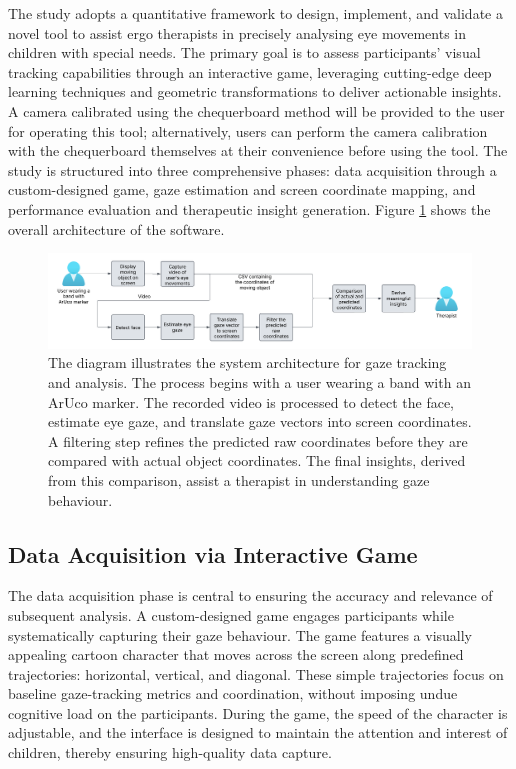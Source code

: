 \documentclass[10pt,a4paper,twoside]{article}
\begin{document}
The study adopts a quantitative framework to design, implement, and validate a novel tool to assist ergo therapists in precisely analysing eye movements in children with special needs. The primary goal is to assess participants' visual tracking capabilities through an interactive game, leveraging cutting-edge deep learning techniques and geometric transformations to deliver actionable insights. A camera calibrated using the chequerboard method will be provided to the user for operating this tool; alternatively, users can perform the camera calibration with the chequerboard themselves at their convenience before using the tool. The study is structured into three comprehensive phases: data acquisition through a custom-designed game, gaze estimation and screen coordinate mapping, and performance evaluation and therapeutic insight generation. Figure \ref{fig:flowchart} shows the overall architecture of the software.

\begin{figure}[htbp]
    \centering
    \includegraphics[width=\textwidth]{image/flowchart.png}
    \caption{The diagram illustrates the system architecture for gaze tracking and analysis. The process begins with a user wearing a band with an ArUco marker. The recorded video is processed to detect the face, estimate eye gaze, and translate gaze vectors into screen coordinates. A filtering step refines the predicted raw coordinates before they are compared with actual object coordinates. The final insights, derived from this comparison, assist a therapist in understanding gaze behaviour.}
    \label{fig:flowchart}
\end{figure}

\subsection{Data Acquisition via Interactive Game}
\label{data}

The data acquisition phase is central to ensuring the accuracy and relevance of subsequent analysis. A custom-designed game engages participants while systematically capturing their gaze behaviour. The game features a visually appealing cartoon character that moves across the screen along predefined trajectories: horizontal, vertical, and diagonal. These simple trajectories focus on baseline gaze-tracking metrics and coordination, without imposing undue cognitive load on the participants. During the game, the speed of the character is adjustable, and the interface is designed to maintain the attention and interest of children, thereby ensuring high-quality data capture.
\end{document}
